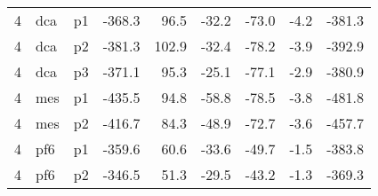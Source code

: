\documentclass[a4paper]{article}
\begin{document}
\begin{table}[ht]
\begin{tabular}{rllrrrrrr}
   4 & dca & p1 & -368.3 & 96.5 & -32.2 & -73.0 & -4.2 & -381.3 \\ 
   4 & dca & p2 & -381.3 & 102.9 & -32.4 & -78.2 & -3.9 & -392.9 \\ 
   4 & dca & p3 & -371.1 & 95.3 & -25.1 & -77.1 & -2.9 & -380.9 \\ 
   4 & mes & p1 & -435.5 & 94.8 & -58.8 & -78.5 & -3.8 & -481.8 \\ 
   4 & mes & p2 & -416.7 & 84.3 & -48.9 & -72.7 & -3.6 & -457.7 \\ 
   4 & pf6 & p1 & -359.6 & 60.6 & -33.6 & -49.7 & -1.5 & -383.8 \\ 
   4 & pf6 & p2 & -346.5 & 51.3 & -29.5 & -43.2 & -1.3 & -369.3 \\ 
   \hline
\end{tabular}
\end{table}
\end{document}
